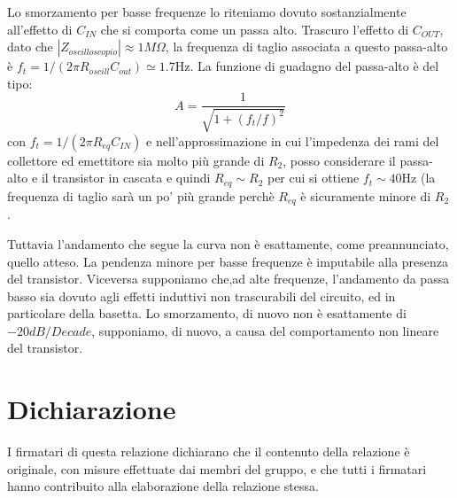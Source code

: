 \documentclass[10pt,a4paper]{article}
\begin{document}
Lo smorzamento per basse frequenze lo riteniamo dovuto sostanzialmente all'effetto di $C_{IN}$ che si comporta come un passa alto. Trascuro l'effetto di $C_{OUT}$, dato che $|Z_{oscilloscopio}|\approx1 M\Omega$, la frequenza di taglio associata a questo passa-alto è $f_t = 1 /(2\pi R_{oscill} C_{out}) \simeq 1.7 \si{\hertz}$.
La funzione di guadagno del passa-alto  è del tipo:\[A=\frac{1}{\sqrt{1+(f_t/f)^2}}\] con $f_t=1/(2\pi R_{eq} C_{IN})$ e  nell'approssimazione in cui l'impedenza dei rami del collettore ed emettitore sia molto più grande di $R_2$, posso considerare il passa-alto e il transistor in cascata e quindi $R_{eq} \sim R_2$ per cui si ottiene $ f_t \sim 40 \si{\hertz}$ (la frequenza di taglio sarà un po' più grande perchè $R_{eq}$ è sicuramente minore di $R_2$ .

Tuttavia l'andamento che segue la curva  non è esattamente, come preannunciato, quello atteso. La pendenza minore per basse frequenze  è imputabile alla presenza del transistor. 
Viceversa supponiamo che,ad  alte frequenze, l'andamento da passa basso sia dovuto agli effetti induttivi non trascurabili del circuito, ed in particolare della basetta.
Lo smorzamento, di nuovo non è esattamente di $-20 dB/Decade$, supponiamo, di nuovo, a causa del comportamento non lineare del transistor.

\section*{Dichiarazione}
I firmatari di questa relazione dichiarano che il contenuto della relazione \`e originale, con misure effettuate dai membri del gruppo, e che tutti i firmatari hanno contribuito alla elaborazione della relazione stessa.
\end{document}
